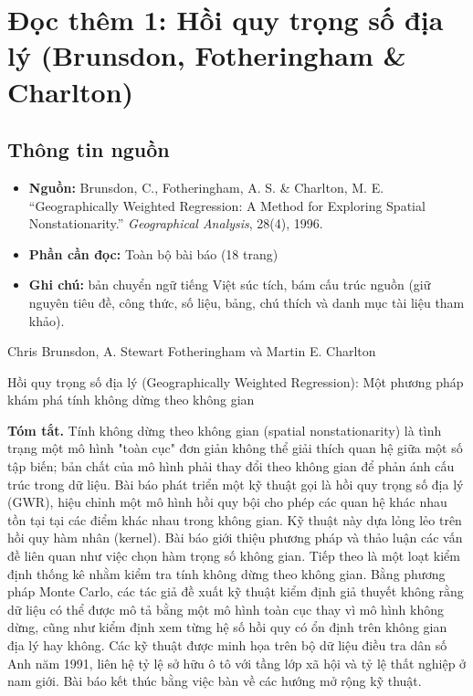 \chapter{Đọc thêm 1: Hồi quy trọng số địa lý (Brunsdon, Fotheringham \& Charlton)}
\label{ch:M6L3DocThem1}

\section{Thông tin nguồn}

\begin{itemize}
  \item \textbf{Nguồn:} Brunsdon, C., Fotheringham, A. S. \& Charlton, M. E. ``Geographically Weighted Regression: A Method for Exploring Spatial Nonstationarity.'' \emph{Geographical Analysis}, 28(4), 1996.
  \item \textbf{Phần cần đọc:} Toàn bộ bài báo (18 trang)
  \item \textbf{Ghi chú:} bản chuyển ngữ tiếng Việt súc tích, bám cấu trúc nguồn (giữ nguyên tiêu đề, công thức, số liệu, bảng, chú thích và danh mục tài liệu tham khảo).
\end{itemize}

Chris Brunsdon, A. Stewart Fotheringham và Martin E. Charlton

Hồi quy trọng số địa lý (Geographically Weighted Regression): Một phương pháp khám phá tính không dừng theo không gian

\textbf{Tóm tắt.} Tính không dừng theo không gian (spatial nonstationarity) là tình trạng một mô hình "toàn cục" đơn giản không thể giải thích quan hệ giữa một số tập biến; bản chất của mô hình phải thay đổi theo không gian để phản ánh cấu trúc trong dữ liệu. Bài báo phát triển một kỹ thuật gọi là hồi quy trọng số địa lý (GWR), hiệu chỉnh một mô hình hồi quy bội cho phép các quan hệ khác nhau tồn tại tại các điểm khác nhau trong không gian. Kỹ thuật này dựa lỏng lẻo trên hồi quy hàm nhân (kernel). Bài báo giới thiệu phương pháp và thảo luận các vấn đề liên quan như việc chọn hàm trọng số không gian. Tiếp theo là một loạt kiểm định thống kê nhằm kiểm tra tính không dừng theo không gian. Bằng phương pháp Monte Carlo, các tác giả đề xuất kỹ thuật kiểm định giả thuyết không rằng dữ liệu có thể được mô tả bằng một mô hình toàn cục thay vì mô hình không dừng, cũng như kiểm định xem từng hệ số hồi quy có ổn định trên không gian địa lý hay không. Các kỹ thuật được minh họa trên bộ dữ liệu điều tra dân số Anh năm 1991, liên hệ tỷ lệ sở hữu ô tô với tầng lớp xã hội và tỷ lệ thất nghiệp ở nam giới. Bài báo kết thúc bằng việc bàn về các hướng mở rộng kỹ thuật.

